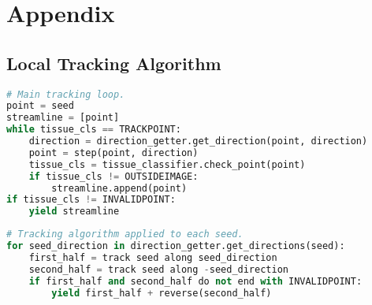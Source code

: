 \section{Appendix}

\subsection{Local Tracking Algorithm}
\label{appendix:algo}

\begin{lstlisting}[language=python]
# Main tracking loop.
point = seed
streamline = [point]
while tissue_cls == TRACKPOINT:
    direction = direction_getter.get_direction(point, direction)
    point = step(point, direction)
    tissue_cls = tissue_classifier.check_point(point)
    if tissue_cls != OUTSIDEIMAGE:
        streamline.append(point)
if tissue_cls != INVALIDPOINT:
    yield streamline
\end{lstlisting}

\begin{lstlisting}[language=python]
# Tracking algorithm applied to each seed.
for seed_direction in direction_getter.get_directions(seed):
    first_half = track seed along seed_direction
    second_half = track seed along -seed_direction
    if first_half and second_half do not end with INVALIDPOINT:
        yield first_half + reverse(second_half)
\end{lstlisting}
